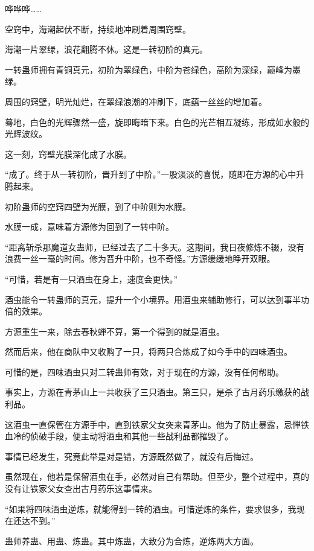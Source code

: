 
\begin{this_body}



哗哗哗……

空窍中，海潮起伏不断，持续地冲刷着周围窍壁。

海潮一片翠绿，浪花翻腾不休。这是一转初阶的真元。

一转蛊师拥有青铜真元，初阶为翠绿色，中阶为苍绿色，高阶为深绿，巅峰为墨绿。

周围的窍壁，明光灿烂，在翠绿浪潮的冲刷下，底蕴一丝丝的增加着。

蓦地，白色的光辉骤然一盛，旋即晦暗下来。白色的光芒相互凝练，形成如水般的光辉波纹。

这一刻，窍壁光膜深化成了水膜。

“成了。终于从一转初阶，晋升到了中阶。”一股淡淡的喜悦，随即在方源的心中升腾起来。

初阶蛊师的空窍四壁为光膜，到了中阶则为水膜。

水膜一成，意味着方源修为回到了一转中阶。

“距离斩杀那魔道女蛊师，已经过去了二十多天。这期间，我日夜修炼不辍，没有浪费一丝一毫的时间。修为晋升中阶，也不奇怪。”方源缓缓地睁开双眼。

“可惜，若是有一只酒虫在身上，速度会更快。”

酒虫能令一转蛊师的真元，提升一个小境界。用酒虫来辅助修行，可以达到事半功倍的效果。

方源重生一来，除去春秋蝉不算，第一个得到的就是酒虫。

然而后来，他在商队中又收购了一只，将两只合炼成了如今手中的四味酒虫。

可惜的是，四味酒虫只对二转蛊师有效，对于现在的方源，没有任何帮助。

事实上，方源在青茅山上一共收获了三只酒虫。第三只，是杀了古月药乐缴获的战利品。

这酒虫一直保管在方源手中，直到铁家父女突来青茅山。他为了防止暴露，忌惮铁血冷的侦破手段，便主动将酒虫和其他一些战利品都摧毁了。

事情已经发生，究竟此举是对是错，方源既然做了，就没有后悔过。

虽然现在，他若是保留酒虫在手，必然对自己有帮助。但至少，整个过程中，真的没有让铁家父女查出古月药乐这事情来。

“如果将四味酒虫逆炼，就能得到一转的酒虫。可惜逆炼的条件，要求很多，我现在还达不到。”

蛊师养蛊、用蛊、炼蛊。其中炼蛊，大致分为合炼，逆炼两大方面。


\end{this_body}
